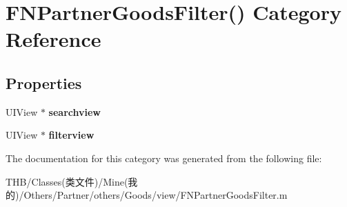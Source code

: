 \hypertarget{category_f_n_partner_goods_filter_07_08}{}\section{F\+N\+Partner\+Goods\+Filter() Category Reference}
\label{category_f_n_partner_goods_filter_07_08}
\subsection*{Properties}
\begin{DoxyCompactItemize}
\item 
\mbox{\label{category_f_n_partner_goods_filter_07_08_a7edc5e4a4c58cb4795e858f47e733933}} 
U\+I\+View $\ast$ {\bfseries searchview}
\item 
\mbox{\label{category_f_n_partner_goods_filter_07_08_ac52a24dcd4a662fdc8286348ab9a0105}} 
U\+I\+View $\ast$ {\bfseries filterview}
\end{DoxyCompactItemize}


The documentation for this category was generated from the following file\+:\begin{DoxyCompactItemize}
\item 
T\+H\+B/\+Classes(类文件)/\+Mine(我的)/\+Others/\+Partner/others/\+Goods/view/F\+N\+Partner\+Goods\+Filter.\+m\end{DoxyCompactItemize}
